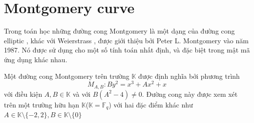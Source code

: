 \documentclass[a4paper,12pt]{report}
\begin{document}
\section{Montgomery curve}
Trong toán học những đường cong Montgomery là một dạng của đường cong elliptic , khác với Weierstrass , được giới thiệu bởi Peter L. Montgomery vào năm 1987. Nó được sử dụng cho một số tính toán nhất định, và đặc biệt trong mật mã ứng dụng khác nhau.

Một đường cong Montgomery trên trường $\mathbb{K}$ được định nghĩa bởi phương trình 
\begin{displaymath}
M_{A,B}: By^2 = x^3 + Ax^2 + x
\end{displaymath}
với điều kiện $A, B \in \mathbb{K}$ và với $B(A^2 - 4) \neq 0$. Đường cong này được xem xét trên một trường hữu hạn $\mathbb{K}$($\mathbb{K} = \mathbb{F}_q$) với hai đặc điểm khác như $A \in \mathbb{K} \setminus \{-2, 2\}, B \in \mathbb{K} \setminus\{0\}$
\end{document}
